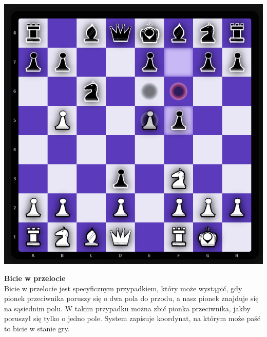 \documentclass[twoside]{projektInzynierskiMS1}
\begin{document}
\noindent
\begin{minipage}[t]{0.3\textwidth} 
    \vspace{0pt} 
    \centering 
    \includegraphics[width=\linewidth]{images/imp_front_enpassant.png} 
\end{minipage} 
\hfill 
\begin{minipage}[t]{0.6\textwidth} 
    \vspace{0pt} 
    \justifying 
    \noindent 
    \textbf{Bicie w przelocie}\\
    Bicie w przelocie jest specyficznym przypadkiem, który może wystąpić, gdy pionek przeciwnika poruszy się o dwa pola do przodu, a nasz pionek znajduje się na sąsiednim polu. W takim przypadku można zbić pionka przeciwnika, jakby poruszył się tylko o jedno pole. System zapisuje koordynat, na którym może paść to bicie w stanie gry.
\end{minipage}

\vspace{0.5cm}
\end{document}
